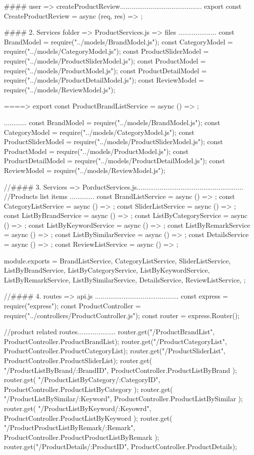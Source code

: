   #### user  => createProductReview...........................................
       export const CreateProductReview = async (req, res) => {};
      
  #### 2. Services folder => ProductServices.js => files ....................
        const BrandModel = require("../models/BrandModel.js");
        const CategoryModel = require("../models/CategoryModel.js");
        const ProductSliderModel = require("../models/ProductSliderModel.js");
        const ProductModel = require("../models/ProductModel.js");
        const ProductDetailModel = require("../models/ProductDetailModel.js");
        const ReviewModel = require("../models/ReviewModel.js");

      ====> export const ProductBrandListService = async () => {};

      ............
      const BrandModel = require("../models/BrandModel.js");
      const CategoryModel = require("../models/CategoryModel.js");
      const ProductSliderModel = require("../models/ProductSliderModel.js");
      const ProductModel = require("../models/ProductModel.js");
      const ProductDetailModel = require("../models/ProductDetailModel.js");
      const ReviewModel = require("../models/ReviewModel.js");

//#### 3. Services => PorductServices.js........................................................
//Products list items .............
     const BrandListService = async () => {};
     const CategoryListService = async () => {};
     const SliderListService = async () => {};
     const ListByBrandService = async () => {};
     const ListByCategoryService = async () => {};
     const ListByKeywordService = async () => {};
     const ListByRemarkService = async () => {};
     const ListBySimilarService = async () => {};
     const DetailsService = async () => {};
     const ReviewListService = async () => {};

module.exports = {
  BrandListService,
  CategoryListService,
  SliderListService,
  ListByBrandService,
  ListByCategoryService,
  ListByKeywordService,
  ListByRemarkService,
  ListBySimilarService,
  DetailsService,
  ReviewListService,
};

//#### 4. routes => api.js ............................................
const express = require("express");
const ProductController = require("../controllers/ProductController.js");
const router = express.Router();

//product related routes....................
router.get("/ProductBrandList", ProductController.ProductBrandList);
router.get("/ProductCategoryList", ProductController.ProductCategoryList);
router.get("/ProductSliderList", ProductController.ProductSliderList);
router.get(
  "/ProductListByBrand/:BrandID",
  ProductController.ProductListByBrand
);
router.get(
  "/ProductListByCategory/:CategoryID",
  ProductController.ProductListByCategory
);
router.get(
  "/ProductListBySimilar/:Keyword",
  ProductController.ProductListBySimilar
);
router.get(
  "/ProductListByKeyword/:Keyowrd",
  ProductController.ProductListByKeyword
);
router.get(
  "/ProductProductListByRemark/:Remark",
  ProductController.ProductProductListByRemark
);
router.get("/ProductDetails/:ProductID", ProductController.ProductDetails);

